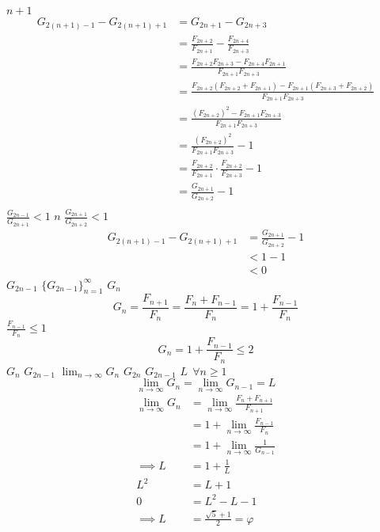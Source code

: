 \documentclass{article}
\begin{document}
$n+1$
\begin{align*}
    G_{2(n+1) -1} - G_{2(n+1) + 1} &= G_{2n+1} - G_{2n+3}\\
    &= \frac{F_{2n+2}}{F_{2n+1}} - \frac{F_{2n+4}}{F_{2n+3}}\\
    &= \frac{F_{2n+2}F_{2n+3} - F_{2n+4}F_{2n+1}}{F_{2n+1}F_{2n+3}}\\
    &= \frac{F_{2n+2}(F_{2n+2}+F_{2n+1}) - F_{2n+1}(F_{2n+3}+F_{2n+2})}{F_{2n+1}F_{2n+3}}\\
    &= \frac{(F_{2n+2})^2 - F_{2n+1}F_{2n+3}}{F_{2n+1}F_{2n+3}}\\
    &= \frac{(F_{2n+2})^2}{F_{2n+1}F_{2n+3}} - 1\\
    &= \frac{F_{2n+2}}{F_{2n+1}} \cdot \frac{F_{2n+2}}{F_{2n+3}} -1\\
    &= \frac{G_{2n+1}}{G_{2n+2}} - 1\\
\end{align*}
$\frac{G_{2n-1}}{G_{2n+1}} < 1$
$n$
$\frac{G_{2n+1}}{G_{2n+2}} < 1$
\begin{align*}
    G_{2(n+1)-1} - G_{2(n+1)+1} &= \frac{G_{2n+1}}{G_{2n+2}} - 1\\
    &< 1 -1\\
    &< 0
\end{align*}
$G_{2n-1}$
$\{G_{2n-1}\}_{n=1}^\infty$
$G_n$
\begin{equation*}
    G_n = \frac{F_{n+1}}{F_n} =  \frac{F_n + F_{n-1}}{F_n} = 1 + \frac{F_{n-1}}{F_n}
\end{equation*}
$\frac{F_{n-1}}{F_n} \le 1$
\begin{equation*}
    G_n = 1 + \frac{F_{n-1}}{F_n} \le 2
\end{equation*}
$G_n$
$G_{2n-1}$
$\lim_{n \to \infty} G_n$
$G_{2n}$
$G_{2n-1}$
$L~~\forall n \ge 1$
\begin{equation*}
    \lim_{n\to \infty}G_n = \lim_{n\to \infty}G_{n-1} = L
\end{equation*}
\begin{align*}
\lim_{n\to \infty}G_n &= \lim_{n \to \infty} \frac{F_{n} +  F_{n+  1} }{F_{n+  1} } \\
&= 1 +  \lim_{n \to \infty} \frac{F_{n- 1} }{F_n} \\
&=  1 +  \lim_{n \to \infty}\frac{1}{G_{n-1}} \\
 \implies L &= 1 + \frac{1}{L}\\
 L^2 &= L + 1\\
 0 &= L^2 - L - 1\\
  \implies  L &= \frac{\sqrt{5} + 1  }{2} = \varphi
\end{align*}
\end{document}
